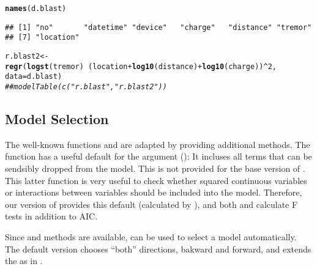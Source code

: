 \documentclass[11pt]{article}\usepackage[]{graphicx}\usepackage[]{color}
\makeatletter
\newcommand{\hlnum}[1]{\textcolor[rgb]{0.686,0.059,0.569}{#1}}%
\newcommand{\hlcom}[1]{\textcolor[rgb]{0.678,0.584,0.686}{\textit{#1}}}%
\newcommand{\hlopt}[1]{\textcolor[rgb]{0,0,0}{#1}}%
\newcommand{\hlstd}[1]{\textcolor[rgb]{0.345,0.345,0.345}{#1}}%
\newcommand{\hlkwb}[1]{\textcolor[rgb]{0.69,0.353,0.396}{#1}}%
\newcommand{\hlkwc}[1]{\textcolor[rgb]{0.333,0.667,0.333}{#1}}%
\newcommand{\hlkwd}[1]{\textcolor[rgb]{0.737,0.353,0.396}{\textbf{#1}}}%
\newenvironment{kframe}{%
 \def\at@end@of@kframe{}%
 \ifinner\ifhmode%
  \def\at@end@of@kframe{\end{minipage}}%
  \begin{minipage}{\columnwidth}%
 \fi\fi%
 \def\FrameCommand##1{\hskip\@totalleftmargin \hskip-\fboxsep
 \colorbox{shadecolor}{##1}\hskip-\fboxsep
     \hskip-\linewidth \hskip-\@totalleftmargin \hskip\columnwidth}%
 \MakeFramed {\advance\hsize-\width
   \@totalleftmargin\z@ \linewidth\hsize
   \@setminipage}}%
 {\par\unskip\endMakeFramed%
 \at@end@of@kframe}
\newenvironment{knitrout}{}{} %
\makeatother
\begin{document}
\begin{knitrout}
\color{fgcolor}\begin{kframe}
\begin{alltt}
\hlkwd{names}\hlstd{(d.blast)}
\end{alltt}
\begin{verbatim}
## [1] "no"       "datetime" "device"   "charge"   "distance" "tremor"  
## [7] "location"
\end{verbatim}
\begin{alltt}
\hlstd{r.blast2} \hlkwb{<-}
  \hlkwd{regr}\hlstd{(}\hlkwd{logst}\hlstd{(tremor)} \hlopt{~} \hlstd{( location} \hlopt{+} \hlkwd{log10}\hlstd{(distance)} \hlopt{+} \hlkwd{log10}\hlstd{(charge) )}\hlopt{^}\hlnum{2}\hlstd{,}
       \hlkwc{data}\hlstd{=d.blast)}
\hlcom{## modelTable(c("r.blast","r.blast2"))             }
\end{alltt}
\end{kframe}
\end{knitrout}

\subsection{Model Selection}
The well-known functions  and  are adapted by 
providing additional methods. 
The function  has a useful default for the argument ():
It incluses all terms that can be sendsibly dropped from the model.
This is not provided for the base version of . 
This latter function is very useful to check whether squared continuous
variables or interactions between variables should be included into the
model. Therefore, our version of  provides this default 
(calculated by ),
and both  and  calculate F tests in addition to AIC.

Since  and  methods are available,  can be used to
select a model automatically. The default  version chooses ``both''
directions, bakward and forward, and extends the  as in .
\end{document}
